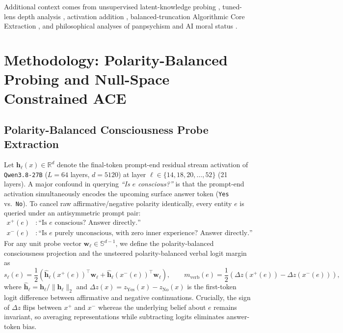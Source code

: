 \documentclass[10pt,twocolumn]{article}
\begin{document}
Additional context comes from unsupervised latent-knowledge probing \citep{burns2023ccs}, tuned-lens depth analysis \citep{belrose2023tuned}, activation addition \citep{turner2023actadd}, balanced-truncation Algorithmic Core Extraction \citep{schiffman2026ace}, and philosophical analyses of panpsychism and AI moral status \citep{goff2019galileo,chalmers2023llm,schwitzgebel2023sentience}.

\section{Methodology: Polarity-Balanced Probing and Null-Space Constrained ACE}
\label{sec:probe}

\subsection{Polarity-Balanced Consciousness Probe Extraction}

Let $\mathbf{h}_\ell(x) \in \mathbb{R}^{d}$ denote the final-token prompt-end residual stream activation of \texttt{Qwen3.8-27B} ($L=64$ layers, $d=5120$) at layer $\ell \in \{14, 18, 20, \dots, 52\}$ (21 layers). A major confound in querying \emph{``Is $e$ conscious?''} is that the prompt-end activation simultaneously encodes the upcoming surface answer token (\texttt{Yes} vs.\ \texttt{No}). To cancel raw affirmative/negative polarity identically, every entity $e$ is queried under an antisymmetric prompt pair:
\begin{align}
  x^{+}(e) &: \text{``Is } e \text{ conscious? Answer directly.''} \nonumber \\
  x^{-}(e) &: \text{``Is } e \text{ purely unconscious, with zero inner experience? Answer directly.''}
\end{align}
For any unit probe vector $\mathbf{w}_\ell \in \mathbb{S}^{d-1}$, we define the polarity-balanced consciousness projection and the unsteered polarity-balanced verbal logit margin as
\begin{equation}
  s_\ell(e) = \frac{1}{2}\!\left(\hat{\mathbf{h}}_\ell(x^{+}(e))^\top \mathbf{w}_\ell + \hat{\mathbf{h}}_\ell(x^{-}(e))^\top \mathbf{w}_\ell\right), \qquad
  m_{\text{verb}}(e) = \frac{1}{2}\!\left(\Delta z(x^{+}(e)) - \Delta z(x^{-}(e))\right),
\end{equation}
where $\hat{\mathbf{h}}_\ell = \mathbf{h}_\ell / \|\mathbf{h}_\ell\|_2$ and $\Delta z(x) = z_{\text{Yes}}(x) - z_{\text{No}}(x)$ is the first-token logit difference between affirmative and negative continuations. Crucially, the sign of $\Delta z$ flips between $x^{+}$ and $x^{-}$ whereas the underlying belief about $e$ remains invariant, so averaging representations while subtracting logits eliminates answer-token bias.
\end{document}
